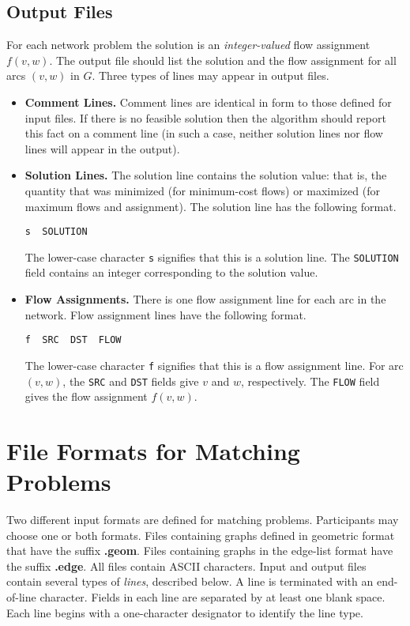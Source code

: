 \subsection{Output Files}
For each network problem the solution is an 
{\em integer-valued} flow assignment $f(v,w)$. 
The output file should list the solution and the flow assignment for all 
arcs $(v,w)$ in $G$.  Three types of lines may appear in output files. 

\begin{itemize} 
\item {\bf Comment Lines.}  Comment lines are identical in 
form to those defined for input files. 
If there is no feasible solution then the
algorithm should report this fact on a comment line (in such a case,
neither  solution lines nor flow lines will appear in the
output). 

\item {\bf Solution Lines.}  The solution line 
contains the solution value:  that is, 
the quantity that was minimized (for minimum-cost flows) or maximized (for 
maximum flows and assignment).   The solution line has the
following format.
\begin{verbatim}
s  SOLUTION
\end{verbatim}
The lower-case character {\tt s} signifies that this is a solution 
line. The {\tt SOLUTION} field contains an integer corresponding
to the solution value.

\item {\bf Flow Assignments.}   There is one flow assignment line
for each arc in the network.  Flow assignment lines have the following
format.
\begin{verbatim}
f  SRC  DST  FLOW
\end{verbatim}  
The lower-case character {\tt f} signifies that this is a flow assignment
line.  For arc $(v,w)$, the {\tt SRC} and {\tt DST} fields give 
$v$ and $w$, respectively.  The {\tt FLOW} field gives the flow assignment
$f(v,w)$. 

\end{itemize}

\section{File Formats for Matching Problems} 

Two different input formats are defined for matching problems. Participants
may choose one or both formats.  
Files containing graphs defined in geometric format that have the suffix
{\bf .geom}.  Files containing graphs in the edge-list format have the
suffix {\bf .edge}.   All files contain ASCII characters.  Input and 
output files contain several types of {\em lines}, described below.  A
line is terminated with an end-of-line character.  Fields in each line 
are separated by at least one blank space.  Each line begins with a 
one-character designator to identify the line type. 

